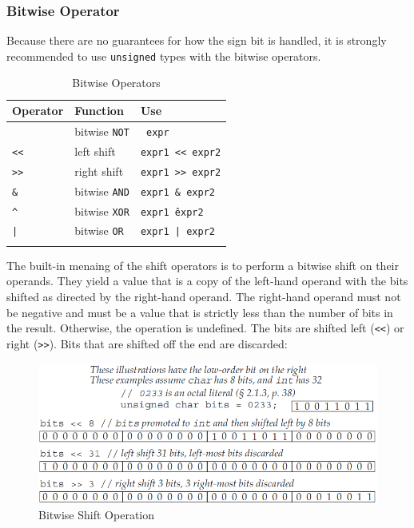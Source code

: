 \subsubsection{Bitwise Operator}

Because there are no guarantees for how the sign bit is handled, it is strongly recommended to use \texttt{unsigned} types with the bitwise operators.

\begin{longtable}{p{.2\linewidth}p{.3\linewidth}p{.3\linewidth}} 
\toprule
Operator & Function & Use \\
\midrule
\endhead

\texttt{~}
&bitwise \texttt{NOT}
&\texttt{~expr}
\\

\midrule

\texttt{<<}
&left shift
&\texttt{expr1 << expr2}
\\
\texttt{>>}
&right shift
&\texttt{expr1 >> expr2}
\\
\midrule

\texttt{\&}
&bitwise \texttt{AND}
&\texttt{expr1 \& expr2}
\\
\midrule

\texttt{\^}
&bitwise \texttt{XOR}
&\texttt{expr1 \^ expr2}
\\
\midrule

\texttt{|}
&bitwise \texttt{OR}
&\texttt{expr1 | expr2}
\\

\midrule
\caption{Bitwise Operators} 
\label{tab:bitwiseoperators}
\end{longtable}

The built-in menaing of the shift operators is to perform a bitwise shift on their operands. They yield a value that is a copy of the left-hand operand with the bits shifted as directed by the right-hand operand. The right-hand operand must not be negative and must be a value that is strictly less than the number of bits in the result. Otherwise, the operation is undefined. The bits are shifted left (\texttt{<<}) or right (\texttt{>>}). Bits that are shifted off the end are discarded:
\begin{figure}[H]
    \centering
    \includegraphics[width=.95\linewidth]{entries/2023/12/05/bitshift.png}
    \caption{Bitwise Shift Operation}
    \label{fig:bitshift}
\end{figure}

